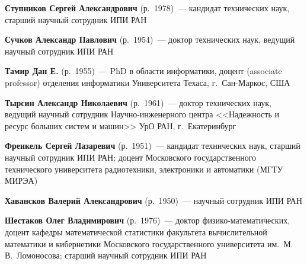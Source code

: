 \begin{multicols}{2}
\vspace*{3pt}

\noindent
\textbf{Ступников Сергей Александрович} (р.\ 1978)~--- 
кандидат технических наук, старший научный сотрудник ИПИ РАН

\vspace*{3pt}

\noindent 
\textbf{Сучков Александр Павлович} (р.\ 1954)~--- доктор технических наук, ведущий научный 
сотрудник ИПИ РАН 

\vspace*{3pt}

\noindent 
\textbf{Тамир Дан Е.} (р.\ 1955)~--- PhD в области информатики, доцент 
(associate professor) отделения информатики Университета Техаса, г.\ Сан-Мар\-кос, 
США

\vspace*{3pt}

\noindent 
\textbf{Тырсин Александр Николаевич} (р.\ 1961)~--- доктор технических наук, ведущий 
научный сотрудник На\-уч\-но-ин\-же\-нер\-но\-го центра <<Надежность и ресурс больших систем 
и машин>> УрО РАН, г.\ Екатеринбург


\vspace*{3pt}

\noindent 
\textbf{Френкель Сергей Лазаревич} (р.\ 1951)~--- кандидат технических 
наук, старший научный сотрудник ИПИ РАН; доцент Московского государственного 
технического университета радиотехники, электроники и автоматики (МГТУ МИРЭА) 

\vspace*{3pt}

\def\rightmark{ОБ АВТОРАХ}
\def\leftmark{ОБ АВТОРАХ}

\noindent 
\textbf{Хавансков Валерий Александрович} (р.\ 1950)~--- научный сотрудник ИПИ РАН


\vspace*{3pt}

\noindent 
\textbf{Шестаков Олег Владимирович} (р.\ 1976)~--- доктор фи\-зи\-ко-ма\-те\-ма\-ти\-че\-ских, доцент 
кафедры математической статистики факультета вычисли\-тельной математики и 
кибернетики Московского государственного университета им.\ М.\,В.~Ломоносова; 
старший научный сотрудник ИПИ РАН

\vspace*{3pt}


\end{multicols}
